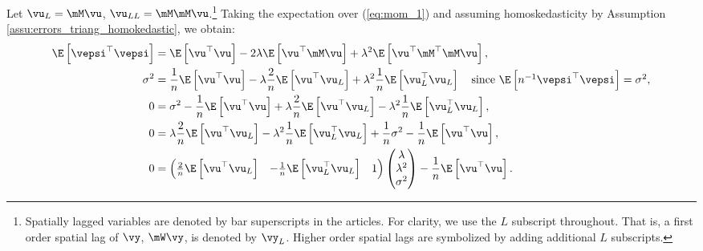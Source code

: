 \documentclass[english,12pt]{book}\usepackage[]{graphicx}\usepackage[]{xcolor}
\begin{document}
Let $\vu_L = \mM\vu$, $\vu_{LL} = \mM\mM\vu$.\footnote{Spatially lagged variables are denoted by bar superscripts in the articles. For clarity, we use the $L$ subscript throughout. That is, a first order spatial lag of $\vy$, $\mW\vy$, is denoted by $\vy_L$. Higher order spatial lags are symbolized by adding additional $L$ subscripts.} Taking the expectation over (\ref{eq:mom_1}) and assuming homoskedasticity by Assumption \ref{assu:errors_triang_homokedastic}, we obtain:
\begin{equation}\label{eq:Pequation_1_gmm}
  \begin{aligned}
      \E\left[\vepsi^\top \vepsi\right] & = \E\left[\vu^\top\vu\right] - 2\lambda\E\left[\vu^\top\mM\vu\right] + \lambda^2\E\left[\vu^\top\mM^\top\mM\vu\right], \\
       \sigma^2& = \frac{1}{n}\E\left[\vu^\top\vu\right] - \lambda \frac{2}{n}\E\left[\vu^\top\vu_L\right] + \lambda^2\frac{1}{n}\E\left[\vu_L^\top\vu_L\right] \quad \mbox{since $\E\left[n^{-1}\vepsi^\top \vepsi\right] = \sigma^2$},\\
       0 &= \sigma^2  - \frac{1}{n}\E\left[\vu^\top\vu\right] + \lambda \frac{2}{n}\E\left[\vu^\top\vu_L\right] - \lambda^2\frac{1}{n}\E\left[\vu_L^\top\vu_L\right],\\
       0 &= \lambda \frac{2}{n}\E\left[\vu^\top\vu_L\right] - \lambda^2\frac{1}{n}\E\left[\vu_L^\top\vu_L\right] + \frac{1}{n}\sigma^2 - \frac{1}{n}\E\left[\vu^\top\vu\right], \\
       0 & =  \begin{pmatrix}
         \frac{2}{n}\E\left[\vu^\top\vu_L\right] & - \frac{1}{n}\E\left[\vu_L^\top\vu_L\right] &  1
            \end{pmatrix}
            \begin{pmatrix}
              \lambda \\
              \lambda^2 \\
              \sigma^2
            \end{pmatrix} - \frac{1}{n}\E\left[\vu^\top\vu\right].
  \end{aligned}
\end{equation}
\end{document}
